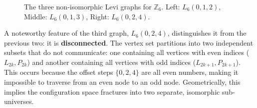 \documentclass[12pt,letterpaper]{amsart}
\begin{document}
\begin{figure}[H]
    \centering
    \caption{The three non-isomorphic Levi graphs for $\mathbb{Z}_6$. Left: $L_6(0,1,2)$, Middle: $L_6(0,1,3)$, Right: $L_6(0,2,4)$.}
    \label{fig:L6_graphs}
\end{figure}


A noteworthy feature of the third graph, $L_6(0,2,4)$, distinguishes it from the previous two: it is \textbf{disconnected}. The vertex set partitions into two independent subsets that do not communicate: one containing all vertices with even indices ($L_{2k}, P_{2k}$) and another containing all vertices with odd indices ($L_{2k+1}, P_{2k+1}$). This occurs because the offset steps $\{0, 2, 4\}$ are all even numbers, making it impossible to traverse from an even node to an odd node. Geometrically, this implies the configuration space fractures into two separate, isomorphic sub-universes.
\end{document}
